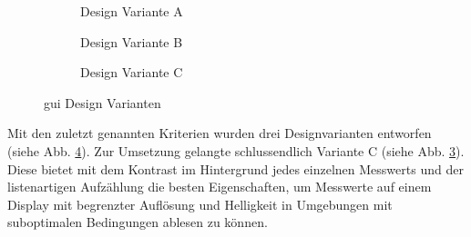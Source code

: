 \begin{figure}[H]
    	\begin{subfigure}[t]{0.5\textwidth}
    		\centering
    		\caption{Design Variante A \label{fig:variante_a}}
    	\end{subfigure}
        \hfill
    	\begin{subfigure}[t]{0.5\textwidth}
    		\centering
    		\caption{Design Variante B \label{fig:variante_b}}
    	\end{subfigure}
    \begin{subfigure}[t]{\textwidth}
		\centering
		\caption{Design Variante C \label{fig:variante_c}}
	\end{subfigure}
	\caption{\acs{gui} Design Varianten \label{fig:design_varianten}}
\end{figure}

Mit den zuletzt genannten Kriterien wurden drei Designvarianten entworfen (siehe Abb. \ref{fig:design_varianten}). Zur Umsetzung gelangte schlussendlich Variante C (siehe Abb. \ref{fig:variante_c}). Diese bietet mit dem Kontrast im Hintergrund jedes einzelnen Messwerts und der listenartigen Aufzählung die besten Eigenschaften, um Messwerte auf einem Display mit begrenzter Auflösung und Helligkeit in Umgebungen mit suboptimalen Bedingungen ablesen zu können. 

